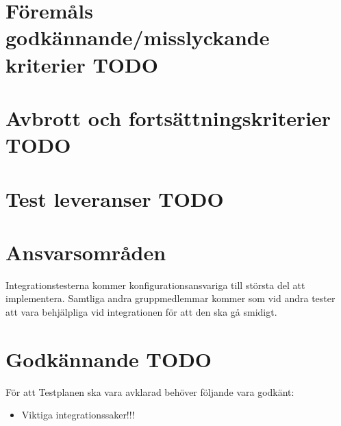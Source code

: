 \documentclass[10pt]{article}
\begin{document}
	
	

\section{Föremåls godkännande/misslyckande kriterier {\color{red}TODO}}
	


\section{Avbrott och fortsättningskriterier {\color{red}TODO}}
	


\section{Test leveranser {\color{red}TODO}}


	

	

\section{Ansvarsområden}
	Integrationstesterna kommer konfigurationsansvariga till största del att implementera. Samtliga andra gruppmedlemmar kommer som vid andra tester att vara behjälpliga vid integrationen för att den ska gå smidigt. 


	
	
	
\section{Godkännande {\color{red}TODO}}
	För att Testplanen ska vara avklarad behöver följande vara godkänt:
	\begin{itemize}
	 \item Viktiga integrationssaker!!!
	\end{itemize}
	
\end{document}
